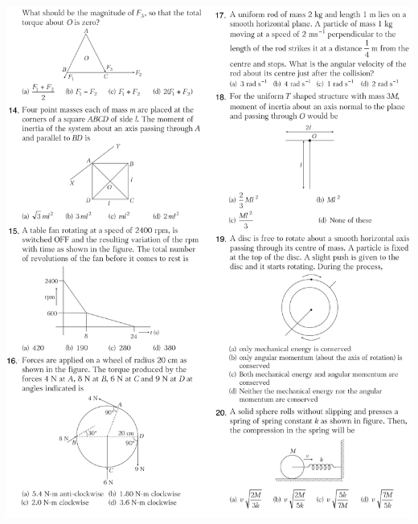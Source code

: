 \documentclass{article}
\begin{document}
\includegraphics[trim={0.25cm 0 0 0},clip, width=170 mm]{14-20.png}
\jeeSectionB
\end{document}
